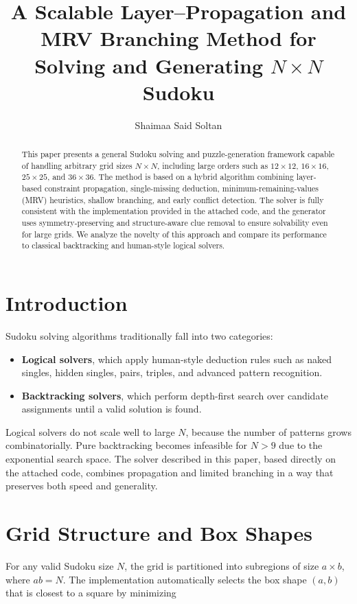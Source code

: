 \documentclass[11pt]{article}
\title{A Scalable Layer--Propagation and MRV Branching Method for Solving and Generating $N \times N$ Sudoku}
\author{Shaimaa Said Soltan}
\date{}
\begin{document}
\maketitle

\begin{abstract}
This paper presents a general Sudoku solving and puzzle-generation framework
capable of handling arbitrary grid sizes $N \times N$, including large orders such as
$12 \times 12$, $16 \times 16$, $25 \times 25$, and $36 \times 36$.
The method is based on a hybrid algorithm combining layer-based constraint propagation,
single-missing deduction, minimum-remaining-values (MRV) heuristics, shallow branching,
and early conflict detection. 
The solver is fully consistent with the implementation provided in the attached code,
and the generator uses symmetry-preserving and structure-aware clue removal to ensure
solvability even for large grids.
We analyze the novelty of this approach and compare its performance to classical
backtracking and human-style logical solvers.
\end{abstract}

\section{Introduction}
Sudoku solving algorithms traditionally fall into two categories:
\begin{itemize}
    \item \textbf{Logical solvers}, which apply human-style deduction rules such as
    naked singles, hidden singles, pairs, triples, and advanced pattern recognition.
    \item \textbf{Backtracking solvers}, which perform depth-first search over candidate
    assignments until a valid solution is found.
\end{itemize}

Logical solvers do not scale well to large $N$, because the number of patterns grows
combinatorially. Pure backtracking becomes infeasible for $N > 9$ due to the exponential
search space. The solver described in this paper, based directly on the attached code,
combines propagation and limited branching in a way that preserves both speed and
generality.

\section{Grid Structure and Box Shapes}
For any valid Sudoku size $N$, the grid is partitioned into subregions of size
$a \times b$, where $ab = N$. The implementation automatically selects the box shape
$(a,b)$ that is closest to a square by minimizing
\end{document}
